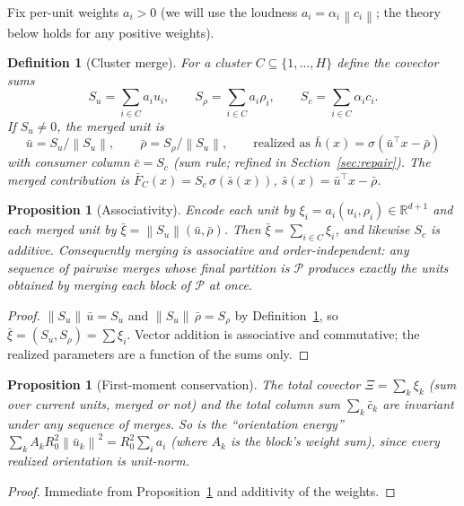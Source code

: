 \documentclass[11pt]{article}
\newtheorem{proposition}[theorem]{Proposition}
\newtheorem{definition}[theorem]{Definition}
\theoremstyle{remark}
\newcommand{\R}{\mathbb{R}}
\newcommand{\relu}{\sigma}
\newcommand{\norm}[1]{\left\lVert #1 \right\rVert}
\begin{document}
Fix per-unit weights $a_i > 0$ (we will use the loudness $a_i =
\alpha_i\norm{c_i}$; the theory below holds for any positive weights).

\begin{definition}[Cluster merge]\label{def:merge}
For a cluster $C \subseteq \{1,\dots,H\}$ define the \emph{covector sums}
\[
  S_u = \sum_{i\in C} a_i u_i, \qquad
  S_\rho = \sum_{i\in C} a_i \rho_i, \qquad
  S_c = \sum_{i\in C} \alpha_i c_i .
\]
If $S_u \ne 0$, the \emph{merged unit} is
\[
  \bar u = S_u/\norm{S_u}, \qquad
  \bar\rho = S_\rho/\norm{S_u}, \qquad
  \text{realized as } \bar h(x) = \relu(\bar u^\top x - \bar\rho)
\]
with consumer column $\bar c = S_c$ (\emph{sum rule}; refined in
Section~\ref{sec:repair}). The merged contribution is
$\bar F_C(x) = S_c\,\relu(\bar s(x))$, $\bar s(x) = \bar u^\top x - \bar\rho$.
\end{definition}

\begin{proposition}[Associativity]\label{prop:assoc}
Encode each unit by $\xi_i = a_i(u_i,\rho_i) \in \R^{d+1}$ and each merged
unit by $\bar\xi = \norm{S_u}(\bar u,\bar\rho)$. Then $\bar\xi =
\sum_{i\in C}\xi_i$, and likewise $S_c$ is additive. Consequently merging is
associative and order-independent: any sequence of pairwise merges whose
final partition is $\mathcal{P}$ produces exactly the units obtained by
merging each block of $\mathcal{P}$ at once.
\end{proposition}

\begin{proof}
$\norm{S_u}\,\bar u = S_u$ and $\norm{S_u}\,\bar\rho = S_\rho$ by
Definition~\ref{def:merge}, so $\bar\xi = (S_u, S_\rho) = \sum \xi_i$.
Vector addition is associative and commutative; the realized parameters are a
function of the sums only.
\end{proof}

\begin{proposition}[First-moment conservation]\label{prop:moment}
The total covector $\Xi = \sum_{k} \xi_k$ (sum over current units, merged or
not) and the total column sum $\sum_k \bar c_k$ are invariant under any
sequence of merges. So is the ``orientation energy''
$\sum_k A_k R_0^2 \norm{\bar u_k}^2 = R_0^2 \sum_i a_i$
(where $A_k$ is the block's weight sum), since every realized orientation is
unit-norm.
\end{proposition}

\begin{proof}
Immediate from Proposition~\ref{prop:assoc} and additivity of the weights.
\end{proof}
\end{document}
